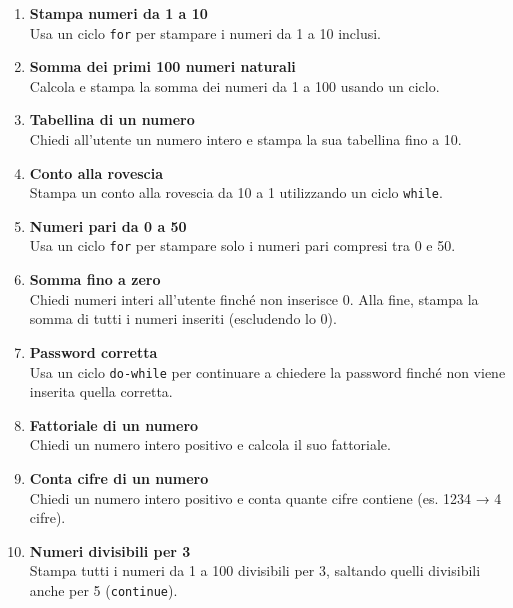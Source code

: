 \documentclass{article}
\begin{document}
\begin{enumerate}
    \item \textbf{Stampa numeri da 1 a 10} \\
    Usa un ciclo \texttt{for} per stampare i numeri da 1 a 10 inclusi.

    \item \textbf{Somma dei primi 100 numeri naturali} \\
    Calcola e stampa la somma dei numeri da 1 a 100 usando un ciclo.

    \item \textbf{Tabellina di un numero} \\
    Chiedi all'utente un numero intero e stampa la sua tabellina fino a 10.

    \item \textbf{Conto alla rovescia} \\
    Stampa un conto alla rovescia da 10 a 1 utilizzando un ciclo \texttt{while}.

    \item \textbf{Numeri pari da 0 a 50} \\
    Usa un ciclo \texttt{for} per stampare solo i numeri pari compresi tra 0 e 50.

    \item \textbf{Somma fino a zero} \\
    Chiedi numeri interi all'utente finché non inserisce 0. Alla fine, stampa la somma di tutti i numeri inseriti (escludendo lo 0).

    \item \textbf{Password corretta} \\
    Usa un ciclo \texttt{do-while} per continuare a chiedere la password finché non viene inserita quella corretta.

    \item \textbf{Fattoriale di un numero} \\
    Chiedi un numero intero positivo e calcola il suo fattoriale.

    \item \textbf{Conta cifre di un numero} \\
    Chiedi un numero intero positivo e conta quante cifre contiene (es. 1234 → 4 cifre).

    \item \textbf{Numeri divisibili per 3} \\
    Stampa tutti i numeri da 1 a 100 divisibili per 3, saltando quelli divisibili anche per 5 (\texttt{continue}).
\end{enumerate}
\end{document}

